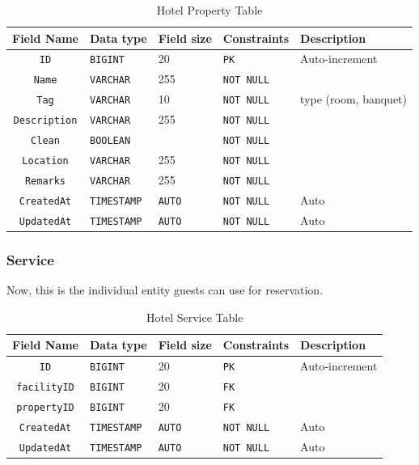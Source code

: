 \begin{table}[H]
	\centering
	\begin{tabular}{cllll}
		\hline
		Field Name & Data type & Field size & Constraints & Description \\ \hline
		\texttt{ID} & \texttt{BIGINT} & 20 & \texttt{PK} & Auto-increment \\
		\texttt{Name} & \texttt{VARCHAR} & 255 & \texttt{NOT NULL} &  \\
		\texttt{Tag} & \texttt{VARCHAR} & 10 & \texttt{NOT NULL} &  type (room, banquet)\\
		\texttt{Description} & \texttt{VARCHAR} & 255 & \texttt{NOT NULL} &  \\
		\texttt{Clean} & \texttt{BOOLEAN} & & \texttt{NOT NULL} &  \\
		\texttt{Location} & \texttt{VARCHAR} & 255 & \texttt{NOT NULL} &  \\
		\texttt{Remarks} & \texttt{VARCHAR} & 255 & \texttt{NOT NULL} &  \\
		
		\texttt{CreatedAt} & \texttt{TIMESTAMP} & \texttt{AUTO} & \texttt{NOT NULL} & Auto \\
		\texttt{UpdatedAt} & \texttt{TIMESTAMP} & \texttt{AUTO} & \texttt{NOT NULL} & Auto \\
		\hline
	\end{tabular}
	\caption{Hotel Property Table}
\end{table}

\subsubsection{Service}

Now, this is the individual entity guests can use for reservation.

\begin{table}[H]
	\centering
	\begin{tabular}{cllll}
		\hline
		Field Name & Data type & Field size & Constraints & Description \\ \hline
		\texttt{ID} & \texttt{BIGINT} & 20 & \texttt{PK} & Auto-increment \\
		\texttt{facilityID} & \texttt{BIGINT} & 20 & \texttt{FK} &  \\
		\texttt{propertyID} & \texttt{BIGINT} & 20 & \texttt{FK} &  \\
		
		\texttt{CreatedAt} & \texttt{TIMESTAMP} & \texttt{AUTO} & \texttt{NOT NULL} & Auto \\
		\texttt{UpdatedAt} & \texttt{TIMESTAMP} & \texttt{AUTO} & \texttt{NOT NULL} & Auto \\
		\hline
	\end{tabular}
	\caption{Hotel Service Table}
\end{table}

